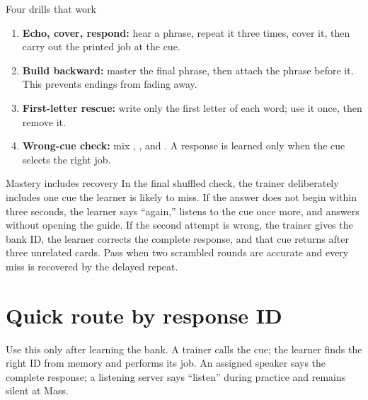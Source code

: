 \begin{coachbox}{Four drills that work}
\begin{enumerate}[leftmargin=1.5em]
\item \textbf{Echo, cover, respond:} hear a phrase, repeat it three times,
  cover it, then carry out the printed job at the cue.
\item \textbf{Build backward:} master the final phrase, then attach the
  phrase before it.  This prevents endings from fading away.
\item \textbf{First-letter rescue:} write only the first letter of each word;
  use it once, then remove it.
\item \textbf{Wrong-cue check:} mix ,
  , and .  A response is
  learned only when the cue selects the right job.
\end{enumerate}
\end{coachbox}

\begin{coachbox}{Mastery includes recovery}
In the final shuffled check, the trainer deliberately includes one cue the
learner is likely to miss. If the answer does not begin within three seconds,
the learner says ``again,'' listens to the cue once more, and answers without
opening the guide. If the second attempt is wrong, the trainer gives the bank
ID, the learner corrects the complete response, and that cue returns after
three unrelated cards. Pass when two scrambled rounds are accurate and every
miss is recovered by the delayed repeat.
\end{coachbox}

\section{Quick route by response ID}

Use this only after learning the bank. A trainer calls the cue; the learner
finds the right ID from memory and performs its job. An assigned speaker says
the complete response; a listening server says ``listen'' during practice and
remains silent at Mass.

